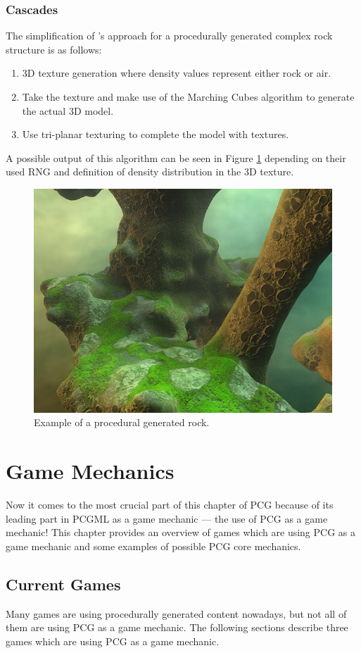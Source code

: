 \documentclass[MGS,Master,english]{twbook}%
\begin{document}
\subsubsection{Cascades}
The simplification of 's approach for a procedurally generated complex rock structure is as follows:
\begin{enumerate}
	\item 3D texture generation where density values represent either rock or air.
	\item Take the texture and make use of the Marching Cubes algorithm to generate the actual 3D model.
	\item Use tri-planar texturing to complete the model with textures.
\end{enumerate}
A possible output of this algorithm can be seen in Figure \ref{cascadesFigure} depending on their used \ac{RNG} and definition of density distribution in the 3D texture. 
\begin{figure}[!htbp]
	\centering
	\includegraphics[width=0.5\linewidth]{PICs/cascades_small}
	\caption{Example of a procedural generated rock. \protect\cite{nvidia::cascades}}\label{cascadesFigure}
\end{figure}

\section{Game Mechanics}
Now it comes to the most crucial part of this chapter of PCG because of its leading part in PCGML as a game mechanic — the use of PCG as a game mechanic! This chapter provides an overview of games which are using PCG as a game mechanic and some examples of possible PCG core mechanics.

\subsection{Current Games} \label{pcgMechanicGames}
Many games are using procedurally generated content nowadays, but not all of them are using PCG as a game mechanic. The following sections describe three games which are using PCG as a game mechanic.
\end{document}
